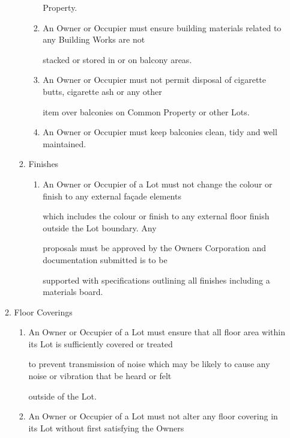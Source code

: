 \documentclass{article}
\begin{document}
\begin{enumerate}[label=\arabic*.]
\begin{enumerate}[label=\arabic{enumi}.\arabic*.]
\begin{enumerate}[label=(\arabic*)]
\begin{enumerate}[label=(\alph*)]
{\fontsize{10.02}{1}Property. }

\item {\fontsize{9.962}{1} An Owner or Occupier must ensure building materials related to any Building Works are not }

{\fontsize{10.02}{1}stacked or stored in or on balcony areas. }

\item {\fontsize{9.962}{1} An Owner or Occupier must not permit disposal of cigarette butts, cigarette ash or any other }

{\fontsize{10.02}{1}item over balconies on Common Property or other Lots. }

\item {\fontsize{9.962}{1} An Owner or Occupier must keep balconies clean, tidy and well maintained. }

\end{enumerate}
\item {\fontsize{9.962}{1} Finishes }

\begin{enumerate}[label=(\alph*)]
\item {\fontsize{9.962}{1} An Owner or Occupier of a Lot must not change the colour or finish to any external façade elements }

{\fontsize{10.02}{1}which includes the colour or finish to any external floor finish outside the Lot boundary. Any }

{\fontsize{10.02}{1}proposals must be approved by the Owners Corporation and documentation submitted is to be }

{\fontsize{10.02}{1}supported with specifications outlining all finishes including a materials board. }

\end{enumerate}
\end{enumerate}
\item {\fontsize{9.99}{1} Floor Coverings }

\begin{enumerate}[label=(\arabic*)]
\item {\fontsize{9.962}{1} An Owner or Occupier of a Lot must ensure that all floor area within its Lot is sufficiently covered or treated }

{\fontsize{10.02}{1}to prevent transmission of noise which may be likely to cause any noise or vibration that be heard or felt }

{\fontsize{10.02}{1}outside of the Lot. }

\item {\fontsize{9.962}{1} An Owner or Occupier of a Lot must not alter any floor covering in its Lot without first satisfying the Owners }


\end{enumerate}
\end{enumerate}
\end{enumerate}
\end{document}

